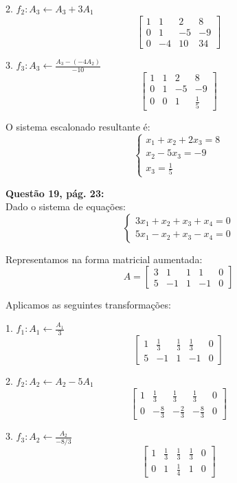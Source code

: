 \documentclass[a4paper,12pt]{article}
\begin{document}
2. \( f_2: A_3 \leftarrow A_3 + 3A_1 \)
\[
\begin{bmatrix}
1 & 1 & 2 & 8 \\
0 & 1 & -5 & -9 \\
0 & -4 & 10 & 34
\end{bmatrix}
\]

3. \( f_3: A_3 \leftarrow \frac{A_3 -(- 4A_2)}{-10} \)
\[
\begin{bmatrix}
1 & 1 & 2 & 8 \\
0 & 1 & -5 & -9 \\
0 & 0 & 1 & \frac{1}{5}
\end{bmatrix}
\]

O sistema escalonado resultante é:
\[
\begin{cases}
x_1 + x_2 + 2x_3 = 8 \\
x_2 - 5x_3 = -9 \\
x_3 = \frac{1}{5}
\end{cases}
\]



\textbf{Questão 19, pág. 23:}\\

Dado o sistema de equações:
\[
\begin{cases}
3x_1 + x_2 + x_3 + x_4 = 0 \\
5x_1 - x_2 + x_3 - x_4 = 0
\end{cases}
\]

Representamos na forma matricial aumentada:
\[
A =
\begin{bmatrix}
3 & 1 & 1 & 1 & 0 \\
5 & -1 & 1 & -1 & 0
\end{bmatrix}
\]

Aplicamos as seguintes transformações:

1. \( f_1: A_1 \leftarrow \frac{A_1}{3} \)
\[
\begin{bmatrix}
1 & \frac{1}{3} & \frac{1}{3} & \frac{1}{3} & 0 \\
5 & -1 & 1 & -1 & 0
\end{bmatrix}
\]

2. \( f_2: A_2 \leftarrow A_2 - 5A_1 \)
\[
\begin{bmatrix}
1 & \frac{1}{3} & \frac{1}{3} & \frac{1}{3} & 0 \\
0 & -\frac{8}{3} & -\frac{2}{3} & -\frac{8}{3} & 0
\end{bmatrix}
\]

3. \( f_3: A_2 \leftarrow \frac{A_2}{-8/3} \)
\[
\begin{bmatrix}
1 & \frac{1}{3} & \frac{1}{3} & \frac{1}{3} & 0 \\
0 & 1 & \frac{1}{4} & 1 & 0
\end{bmatrix}
\]
\end{document}
